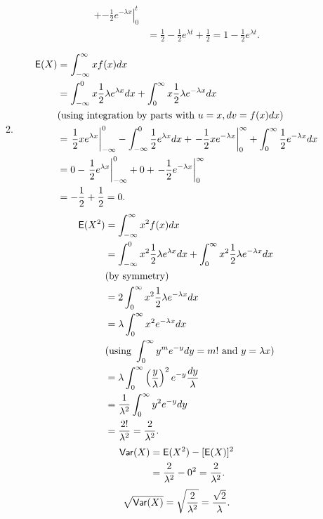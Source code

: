 \documentclass[12pt]{article}
\newcommand{\E}{{\sf E}}
\newcommand{\Var}{{\sf Var}}
\newenvironment{problem}[2][Problem]{\begin{trivlist}
\item[\hskip \labelsep {\bfseries #1}\hskip \labelsep {\bfseries #2.}]}
{\end{trivlist}}
\begin{document}
\begin{problem}{3}
\begin{itemize}
\begin{enumerate}
\[\begin{aligned}
          + \left. -\frac12 e^{-\lambda x} \right|_{0}^{t} \\
          &= \frac12 -\frac12 e^{\lambda t} + \frac12 = 1 - 
          \frac12 e^{\lambda t}.
        \end{aligned}
      \]
      \item 
      \[
        \begin{aligned}
          \E(X) &= \int_{-\infty}^{\infty} x f(x) dx \\
          &= \int_{-\infty}^{0} x \frac12 \lambda e^{\lambda x} dx
          + \int_{0}^{\infty} x \frac12 \lambda e^{-\lambda x} dx \\
          &(\text{using integration by parts with } u = x, dv = f(x)dx) \\
          &= \left. \frac12 x e^{\lambda x} \right|_{-\infty}^{0}
          - \int_{-\infty}^{0} \frac12 e^{\lambda x} dx
          + \left. -\frac12 x e^{-\lambda x} \right|_{0}^{\infty}
          + \int_{0}^{\infty} \frac12 e^{-\lambda x} dx \\
          &= 0 - \left. \frac12 e^{\lambda x} \right|_{-\infty}^{0}
          + 0 + \left. -\frac12 e^{-\lambda x} \right|_{0}^{\infty} \\
          &= -\frac12 + \frac12 = 0.
        \end{aligned}
      \]
      \[
        \begin{aligned}
          \E(X^2) &= \int_{-\infty}^{\infty} x^2 f(x) dx \\
          &= \int_{-\infty}^{0} x^2 \frac12 \lambda e^{\lambda x} dx
          + \int_{0}^{\infty} x^2 \frac12 \lambda e^{-\lambda x} dx \\
          &(\text{by symmetry}) \\
          &= 2 \int_{0}^{\infty} x^2 \frac12 \lambda e^{-\lambda x} dx \\
          &= \lambda \int_{0}^{\infty} x^2 e^{-\lambda x} dx \\
          &(\text{using } \int_{0}^{\infty} y^me^{-y}dy = m! 
          \text{ and } y = \lambda x) \\
          &= \lambda \int_{0}^{\infty} \left(\frac{y}{\lambda}\right)^2
          e^{-y} \frac{dy}{\lambda} \\
          &= \frac{1}{\lambda^2} \int_{0}^{\infty} y^2 e^{-y} dy \\
          &= \frac{2!}{\lambda^2} = \frac{2}{\lambda^2}.
        \end{aligned}
      \]
      \[
        \begin{aligned}
          \Var(X) &= \E(X^2) - [\E(X)]^2 \\
          &= \frac{2}{\lambda^2} - 0^2 = \frac{2}{\lambda^2}.
        \end{aligned}
      \]
      \[
        \sqrt{\Var(X)} = \sqrt{\frac{2}{\lambda^2}} 
        = \frac{\sqrt{2}}{\lambda}.
      \]
    \end{enumerate}
  \end{itemize}
\end{problem}
\end{document}
